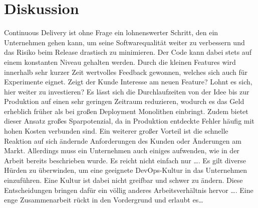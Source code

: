 \section{Diskussion}
Continuous Delivery ist ohne Frage ein lohnenswerter Schritt, den ein Unternehmen gehen kann, um seine Softwarequalität weiter zu verbessern und das Risiko beim Release drastisch zu minimieren. Der Code kann dabei stets auf einem konstanten Niveau gehalten werden. Durch die kleinen Features wird innerhalb sehr kurzer Zeit wertvolles Feedback gewonnen, welches sich auch für Experimente eignet. Zeigt der Kunde Interesse am neuen Feature? Lohnt es sich, hier weiter zu investieren? Es lässt sich die Durchlaufzeiten von der Idee bis zur Produktion auf einen sehr geringen Zeitraum reduzieren, wodurch es das Geld erheblich früher als bei großen Deployment Monolithen einbringt. Zudem bietet dieser Ansatz großes Sparpotenzial, da in Produktion entdeckte Fehler häufig mit hohen Kosten verbunden sind. Ein weiterer großer Vorteil ist die schnelle Reaktion auf sich ändernde Anforderungen des Kunden oder Änderungen am Markt. Allerdings muss ein Unternehmen auch einiges aufwenden, wie in der Arbeit bereits beschrieben wurde. 
Es reicht nicht einfach nur …. Es gilt diverse Hürden zu überwinden, um eine geeignete DevOps-Kultur in das Unternehmen einzuführen. Eine Kultur ist dabei nicht greifbar und schwer zu ändern. Diese Entscheidungen bringen dafür ein völlig anderes Arbeitsverhältnis hervor …. Eine enge Zusammenarbeit rückt in den Vordergrund und erlaubt es…


\ifCLASSOPTIONcaptionsoff
  \newpage
\fi
